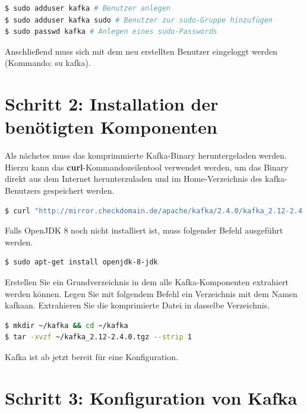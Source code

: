 \documentclass[a4paper,titlepage,halfparskip,12pt]{scrreprt}
\begin{document}
\smallskip

\begin{lstlisting}[language=Bash]
$ sudo adduser kafka # Benutzer anlegen
$ sudo adduser kafka sudo # Benutzer zur sudo-Gruppe hinzufügen
$ sudo passwd kafka # Anlegen eines sudo-Passwords
\end{lstlisting}

Anschließend muss sich mit dem neu erstellten Benutzer eingeloggt werden (Kommando: su kafka).

\section{Schritt 2: Installation der benötigten Komponenten}


Als nächstes muss das komprimmierte Kafka-Binary heruntergeladen werden. Hierzu kann das \textbf{curl}-Kommandozeilentool verwendet werden, um das Binary direkt aus dem Internet herunterzuladen und im Home-Verzeichnis des kafka-Benutzers gespeichert werden.

\smallskip

\begin{lstlisting}[language=Bash]
$ curl "http://mirror.checkdomain.de/apache/kafka/2.4.0/kafka_2.12-2.4.0.tgz" -o ~/kafka_2.12-2.4.0.tgz
\end{lstlisting}

Falls OpenJDK 8 noch nicht installiert ist, muss folgender Befehl ausgeführt werden.

\smallskip

\begin{lstlisting}[language=Bash]
$ sudo apt-get install openjdk-8-jdk
\end{lstlisting}

Erstellen Sie ein Grundverzeichnis in dem alle Kafka-Komponenten extrahiert werden können. Legen Sie mit folgendem Befehl ein Verzeichnis mit dem Namen \glqq kafka\grqq an. Extrahieren Sie die komprimierte Datei in dasselbe Verzeichnis.

\smallskip

\begin{lstlisting}[language=Bash]
$ mkdir ~/kafka && cd ~/kafka
$ tar -xvzf ~/kafka_2.12-2.4.0.tgz --strip 1
\end{lstlisting}

Kafka ist ab jetzt bereit für eine Konfiguration.

\section{Schritt 3: Konfiguration von Kafka}
\end{document}
